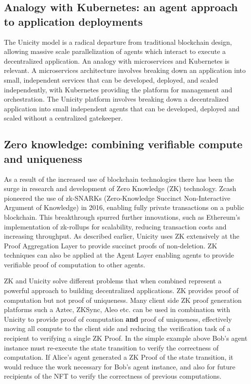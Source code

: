 \documentclass{article}
\begin{document}
\subsection{Analogy with Kubernetes: an agent approach to application deployments}

The Unicity model is a radical departure from traditional blockchain design, allowing massive scale parallelization of agents which interact to execute a decentralized application. An analogy with microservices and Kubernetes is relevant. A microservices architecture involves breaking down an application into small, independent services that can be developed, deployed, and scaled independently, with Kubernetes providing the platform for management and orchestration. The Unicity platform involves breaking down a decentralized application into small independent agents that can be developed, deployed and scaled without a centralized gatekeeper.


\subsection{Zero knowledge: combining verifiable compute and  uniqueness}

As a result of the increased use of blockchain technologies there has been the surge in research and development of Zero Knowledge (ZK) technology. Zcash pioneered the use of zk-SNARKs (Zero-Knowledge Succinct Non-Interactive Argument of Knowledge) in 2016, enabling fully private transactions on a public blockchain. This breakthrough spurred further innovations, such as Ethereum's implementation of zk-rollups for scalability, reducing transaction costs and increasing throughput. As described earlier, Unicity uses ZK extensively at the Proof Aggregation Layer to provide succinct proofs of non-deletion. ZK techniques can also be applied at the Agent Layer enabling agents to provide verifiable proof of computation to other agents.

ZK and Unicity solve different problems that when combined represent a powerful approach to building decentralized applications. ZK provides proof of computation but not proof of uniqueness. Many client side ZK proof generation platforms such a Aztec, ZKSync, Aleo etc. can be used in combination with Unicity to provide proof of computation \textbf{and} proof of uniqueness, effectively moving all compute to the client side and reducing the verification task of a recipient to verifying a single ZK Proof. In the simple example above Bob's agent instance must re-execute the state transition to verify the correctness of computation. If Alice's agent generated a ZK Proof of the state transition, it would reduce the work necessary for Bob's agent instance, and also for future recipients of the NFT to verify the correctness of previous computations.
\end{document}
